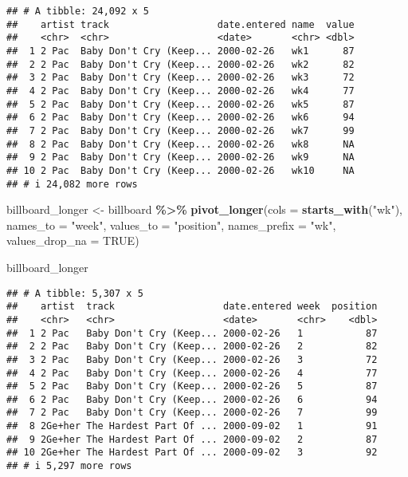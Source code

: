 \documentclass[
]{article}
\newenvironment{Shaded}{\begin{snugshade}}{\end{snugshade}}
\newcommand{\AttributeTok}[1]{\textcolor[rgb]{0.13,0.29,0.53}{#1}}
\newcommand{\ConstantTok}[1]{\textcolor[rgb]{0.56,0.35,0.01}{#1}}
\newcommand{\FunctionTok}[1]{\textcolor[rgb]{0.13,0.29,0.53}{\textbf{#1}}}
\newcommand{\NormalTok}[1]{#1}
\newcommand{\OtherTok}[1]{\textcolor[rgb]{0.56,0.35,0.01}{#1}}
\newcommand{\SpecialCharTok}[1]{\textcolor[rgb]{0.81,0.36,0.00}{\textbf{#1}}}
\newcommand{\StringTok}[1]{\textcolor[rgb]{0.31,0.60,0.02}{#1}}
\begin{document}
\begin{verbatim}
## # A tibble: 24,092 x 5
##    artist track                   date.entered name  value
##    <chr>  <chr>                   <date>       <chr> <dbl>
##  1 2 Pac  Baby Don't Cry (Keep... 2000-02-26   wk1      87
##  2 2 Pac  Baby Don't Cry (Keep... 2000-02-26   wk2      82
##  3 2 Pac  Baby Don't Cry (Keep... 2000-02-26   wk3      72
##  4 2 Pac  Baby Don't Cry (Keep... 2000-02-26   wk4      77
##  5 2 Pac  Baby Don't Cry (Keep... 2000-02-26   wk5      87
##  6 2 Pac  Baby Don't Cry (Keep... 2000-02-26   wk6      94
##  7 2 Pac  Baby Don't Cry (Keep... 2000-02-26   wk7      99
##  8 2 Pac  Baby Don't Cry (Keep... 2000-02-26   wk8      NA
##  9 2 Pac  Baby Don't Cry (Keep... 2000-02-26   wk9      NA
## 10 2 Pac  Baby Don't Cry (Keep... 2000-02-26   wk10     NA
## # i 24,082 more rows
\end{verbatim}

\begin{Shaded}
\begin{Highlighting}[]
\NormalTok{billboard\_longer }\OtherTok{\textless{}{-}}\NormalTok{ billboard }\SpecialCharTok{\%\textgreater{}\%}
  \FunctionTok{pivot\_longer}\NormalTok{(}\AttributeTok{cols =} \FunctionTok{starts\_with}\NormalTok{(}\StringTok{"wk"}\NormalTok{), }
               \AttributeTok{names\_to =} \StringTok{"week"}\NormalTok{,}
               \AttributeTok{values\_to =} \StringTok{"position"}\NormalTok{,}
               \AttributeTok{names\_prefix =} \StringTok{"wk"}\NormalTok{,}
               \AttributeTok{values\_drop\_na =} \ConstantTok{TRUE}\NormalTok{)}

\NormalTok{billboard\_longer}
\end{Highlighting}
\end{Shaded}

\begin{verbatim}
## # A tibble: 5,307 x 5
##    artist  track                   date.entered week  position
##    <chr>   <chr>                   <date>       <chr>    <dbl>
##  1 2 Pac   Baby Don't Cry (Keep... 2000-02-26   1           87
##  2 2 Pac   Baby Don't Cry (Keep... 2000-02-26   2           82
##  3 2 Pac   Baby Don't Cry (Keep... 2000-02-26   3           72
##  4 2 Pac   Baby Don't Cry (Keep... 2000-02-26   4           77
##  5 2 Pac   Baby Don't Cry (Keep... 2000-02-26   5           87
##  6 2 Pac   Baby Don't Cry (Keep... 2000-02-26   6           94
##  7 2 Pac   Baby Don't Cry (Keep... 2000-02-26   7           99
##  8 2Ge+her The Hardest Part Of ... 2000-09-02   1           91
##  9 2Ge+her The Hardest Part Of ... 2000-09-02   2           87
## 10 2Ge+her The Hardest Part Of ... 2000-09-02   3           92
## # i 5,297 more rows
\end{verbatim}
\end{document}
